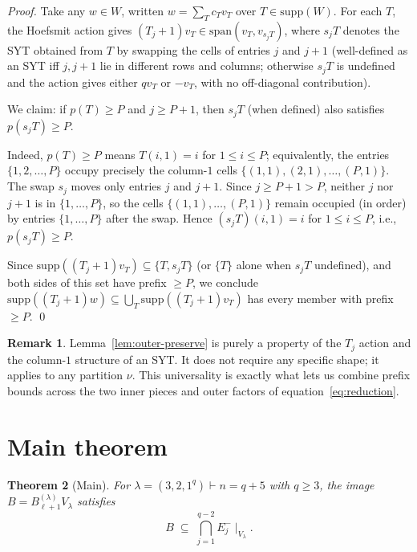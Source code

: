 \documentclass[11pt]{article}
\newtheorem{theorem}{Theorem}
\theoremstyle{definition}
\newtheorem{remark}[theorem]{Remark}
\newcommand{\Bdec}{B_{\ell+1}^{(\lambda)}}
\newcommand{\supp}{\mathrm{supp}}
\begin{document}
\begin{proof}
Take any $w \in W$, written $w = \sum_T c_T v_T$ over $T \in \supp(W)$.
For each $T$, the Hoefsmit action gives
$(T_j + 1) v_T \in \mathrm{span}(v_T, v_{s_j T})$, where $s_j T$
denotes the SYT obtained from $T$ by swapping the cells of entries
$j$ and $j+1$ (well-defined as an SYT iff $j, j+1$ lie in different
rows and columns; otherwise $s_j T$ is undefined and the action gives
either $q v_T$ or $-v_T$, with no off-diagonal contribution).

We claim: if $p(T) \ge P$ and $j \ge P + 1$, then $s_j T$ (when
defined) also satisfies $p(s_j T) \ge P$.

Indeed, $p(T) \ge P$ means $T(i, 1) = i$ for $1 \le i \le P$;
equivalently, the entries $\{1, 2, \ldots, P\}$ occupy precisely the
column-$1$ cells $\{(1, 1), (2, 1), \ldots, (P, 1)\}$.  The swap $s_j$
moves only entries $j$ and $j + 1$.  Since $j \ge P + 1 > P$, neither
$j$ nor $j + 1$ is in $\{1, \ldots, P\}$, so the cells $\{(1, 1),
\ldots, (P, 1)\}$ remain occupied (in order) by entries $\{1, \ldots,
P\}$ after the swap.  Hence $(s_j T)(i, 1) = i$ for $1 \le i \le P$,
i.e., $p(s_j T) \ge P$.

Since $\supp((T_j + 1) v_T) \subseteq \{T, s_j T\}$ (or $\{T\}$ alone
when $s_j T$ undefined), and both sides of this set have prefix
$\ge P$, we conclude $\supp((T_j + 1) w) \subseteq \bigcup_T
\supp((T_j + 1) v_T)$ has every member with prefix $\ge P$.
\qed
\end{proof}

\begin{remark}\label{rem:inner-shape}
Lemma~\ref{lem:outer-preserve} is purely a property of the $T_j$
action and the column-$1$ structure of an SYT.  It does not require
any specific shape; it applies to any partition $\nu$.  This
universality is exactly what lets us combine prefix bounds across the
two inner pieces and outer factors of equation~\eqref{eq:reduction}.
\end{remark}

\section{Main theorem}\label{sec:main}

\begin{theorem}[Main]\label{thm:main}
For $\lambda = (3, 2, 1^q) \vdash n = q + 5$ with $q \ge 3$, the
image $B = \Bdec V_\lambda$ satisfies
\[
   B \;\subseteq\; \bigcap_{j=1}^{q-2} E_j^-\!\mid_{V_\lambda}.
\]
\end{theorem}
\end{document}
